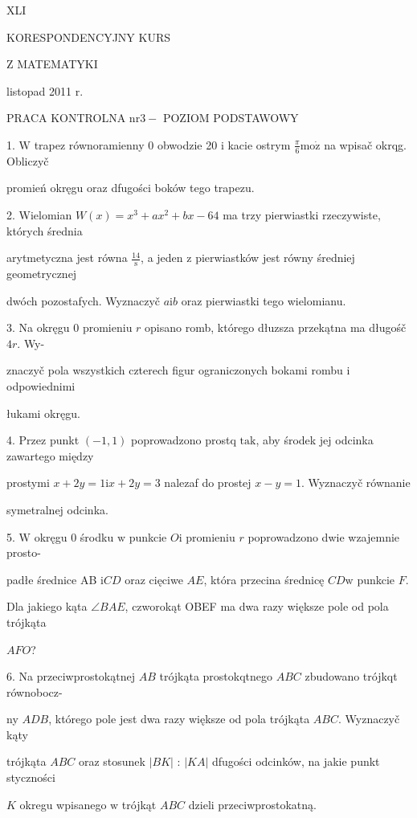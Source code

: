 \documentclass[a4paper,12pt]{article}
\begin{document}
XLI

KORESPONDENCYJNY KURS

Z MATEMATYKI

listopad 2011 r.

PRACA KONTROLNA $\mathrm{n}\mathrm{r} 3-$ POZIOM PODSTAWOWY

1. $\mathrm{W}$ trapez równoramienny $0$ obwodzie 20 $\mathrm{i}$ kacie ostrym $\displaystyle \frac{\pi}{6}\mathrm{m}\mathrm{o}\dot{\mathrm{z}}$ na wpisač okrqg. Obliczyč

promień okręgu oraz dfugości boków tego trapezu.

2. Wielomian $W(x)=x^{3}+ax^{2}+bx-64$ ma trzy pierwiastki rzeczywiste, których średnia

arytmetyczna jest równa $\displaystyle \frac{14}{\mathrm{s}}$, a jeden $\mathrm{z}$ pierwiastków jest równy średniej geometrycznej

dwóch pozostafych. Wyznaczyč $a\mathrm{i}b$ oraz pierwiastki tego wielomianu.

3. Na okręgu $0$ promieniu $r$ opisano romb, którego dłuzsza przekątna ma długośč $4r$. Wy-

znaczyč pola wszystkich czterech figur ograniczonych bokami rombu $\mathrm{i}$ odpowiednimi

łukami okręgu.

4. Przez punkt $(-1,1)$ poprowadzono prostq $\mathrm{t}\mathrm{a}\mathrm{k}$, aby środek jej odcinka zawartego między

prostymi $x+2y= 1\mathrm{i}x+2y=3$ nalezaf do prostej $x-y= 1$. Wyznaczyč równanie

symetralnej odcinka.

5. $\mathrm{W}$ okręgu $0$ środku $\mathrm{w}$ punkcie $O\mathrm{i}$ promieniu $r$ poprowadzono dwie wzajemnie prosto-

padłe średnice AB $\mathrm{i}CD$ oraz cięciwe $AE$, która przecina średnicę $CD\mathrm{w}$ punkcie $F.$

Dla jakiego kąta $\angle BAE$, czworokąt OBEF ma dwa razy większe pole od pola trójkąta

$AFO$?

6. Na przeciwprostokątnej $AB$ trójkąta prostokqtnego $ABC$ zbudowano trójkqt równobocz-

ny $ADB$, którego pole jest dwa razy większe od pola trójkąta $ABC$. Wyznaczyč kąty

trójkąta $ABC$ oraz stosunek $|BK|$ : $|KA|$ dfugości odcinków, na jakie punkt styczności

$K$ okregu wpisanego $\mathrm{w}$ trójkąt $ABC$ dzieli przeciwprostokatną.
\end{document}
